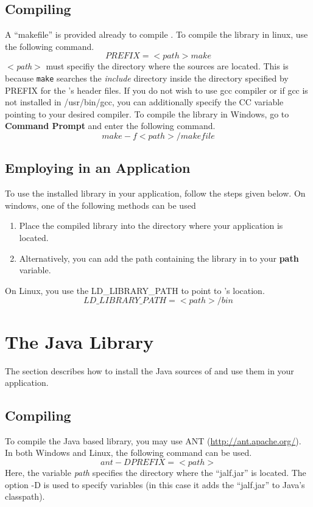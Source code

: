 \subsection*{Compiling \libalf}
A ``makefile'' is provided already to compile \libalf. \vskip 1pt
To compile the library in linux, use the following command.
\[
  PREFIX = <path> make
\]
\emph{$<$path$>$} must specifiy the directory where the \libalf sources are located. This is because \texttt{make} searches the \emph{include} directory inside the directory specified by PREFIX for the \libalf's header files. If you do not wish to use gcc compiler or if gcc is not installed in /usr/bin/gcc, you can additionally specify the CC variable pointing to your desired \cpp compiler. \vskip 1pt
To compile the library in Windows, go to \textbf{Command Prompt} and enter the following command.
\[
 make -f <path>/makefile
\]
\subsection*{Employing \libalf in an Application}
To use the installed library in your application, follow the steps given below. \vskip 1pt
On windows, one of the following methods can be used
\begin{enumerate}
 \item Place the compiled library into the directory where your application is located.
 \item Alternatively, you can add the path containing the \libalf library in to your \textbf{path} variable.
\end{enumerate}
On Linux, you use the LD\_LIBRARY\_PATH to point to \libalf's location.
\[
  LD\_LIBRARY\_PATH = <path>/bin
\]

\section{The \libalf Java Library}
The section describes how to install the Java sources of \libalf and use them in your application.
\subsection*{Compiling \libalf}
To compile the Java based \libalf library, you may use ANT (\url{http://ant.apache.org/}). \vskip 1pt
In both Windows and Linux, the following command can be used.
\[
  ant -D PREFIX=<path>
\]
Here, the variable \emph{path} specifies the directory where the ``jalf.jar'' is located. The option -D is used to specify variables (in this case it adds the ``jalf.jar'' to Java's classpath). \vskip 1pt

